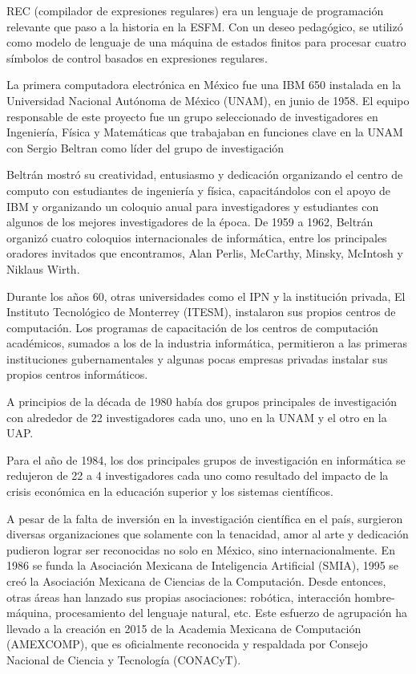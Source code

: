 \documentclass[notitlepage,letterpaper, 11pt]{article}
\begin{document}
\noindent REC (compilador de expresiones regulares) era un lenguaje de programación relevante que paso a la historia en la ESFM.
\noindent Con un deseo pedagógico, se utilizó como modelo de lenguaje de una máquina de estados finitos para procesar cuatro símbolos de control
 basados en expresiones regulares.

\noindent La primera computadora electrónica en México fue una IBM 650 instalada en la Universidad Nacional Autónoma de México (UNAM), en junio de 1958. El equipo responsable de este proyecto fue un grupo seleccionado de investigadores en Ingeniería, Física y Matemáticas que trabajaban en funciones clave en la UNAM con  Sergio Beltran como líder del grupo de investigación 

\noindent Beltrán mostró su creatividad, entusiasmo y dedicación organizando el centro de computo con estudiantes de ingeniería y física, capacitándolos con el apoyo de IBM y organizando un coloquio anual para investigadores y estudiantes con algunos de los mejores investigadores de la época. De 1959 a 1962, Beltrán organizó cuatro coloquios internacionales de informática, entre los principales oradores invitados que encontramos, Alan Perlis, McCarthy, Minsky, McIntosh y Niklaus Wirth.

\noindent Durante los años 60, otras universidades como el IPN y la institución privada, El Instituto Tecnológico de Monterrey (ITESM), instalaron sus propios centros de computación. Los programas de capacitación de los centros de computación académicos, sumados a los de la industria informática, permitieron a las primeras instituciones gubernamentales y algunas pocas empresas privadas instalar sus propios centros informáticos.

\noindent A principios de la década de 1980 había dos grupos principales de investigación con alrededor de 22 investigadores cada uno, uno en la UNAM y el otro en la UAP. 

\noindent Para el año de 1984, los dos principales grupos de investigación en informática se redujeron de 22 a 4 investigadores cada uno como resultado del impacto de la crisis económica en la educación superior y los sistemas científicos.

\noindent A pesar de la falta de inversión en la investigación científica en el país, surgieron diversas organizaciones que solamente con la tenacidad, amor al arte y dedicación pudieron lograr ser reconocidas no solo en México, sino internacionalmente.
En 1986 se funda la Asociación Mexicana de Inteligencia Artificial (SMIA), 1995 se creó la Asociación Mexicana de Ciencias de la Computación. Desde entonces, otras áreas han lanzado sus propias asociaciones: robótica, interacción hombre-máquina, procesamiento del lenguaje natural, etc. Este esfuerzo de agrupación ha llevado a la creación en 2015 de la Academia Mexicana de Computación (AMEXCOMP), que es oficialmente reconocida y respaldada por Consejo Nacional de Ciencia y Tecnología (CONACyT).
\end{document}

